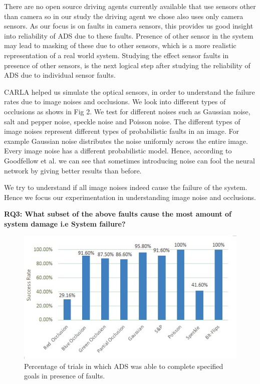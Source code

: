There are no open source driving agents currently available that use sensors other than camera so in our study the driving agent we chose also uses only camera sensors. As our focus is on faults in camera sensors, this provides us good insight into reliability of ADS due to these faults. Presence of other sensor in the system may lead to masking of these due to other sensors, which is a more realistic representation of a real world system. Studying the effect sensor faults in presence of other sensors, is the next logical step after studying the reliability of ADS due to individual sensor faults.  

CARLA helped us simulate the optical sensors, in order to understand the failure rates due to image noises and occlusions. We look into different types of occlusions as shows in Fig 2. We test for different noises such as Gaussian noise, salt and pepper noise, speckle noise and Poisson noise. The different types of image noises represent different types of probabilistic faults in an image. For example Gaussian noise distributes the noise uniformly across the entire image. Every image noise has a different probabilistic model. Hence, according to Goodfellow et al.\cite{2014arXiv1412.6572G} we can see that sometimes introducing noise can fool the neural network by giving better results than before. 

We try to understand if all image noises indeed cause the failure of the system. Hence we focus our experimentation in understanding image noise and occlusions.

\textbf{RQ3: What subset of the above faults cause the most amount of system damage i.e System failure?}

\begin{figure}
	\vspace{-0.5em}
	\centering
	\includegraphics[scale=0.7]{success_rate}
	\vspace{-0.5em}
	\caption{Percentage of trials in which ADS was able to complete specified goals in presence of faults.}
	\label{fig:success_rate}
	\vspace{-1.5em}
\end{figure}

